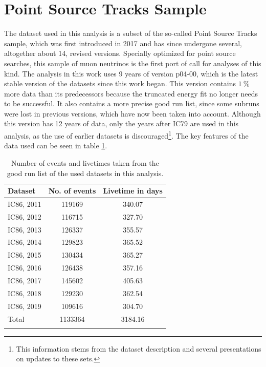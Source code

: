 \section{Point Source Tracks Sample} \label{sec:data}
%
%
%

The dataset used in this analysis is a subset of the so-called Point Source Tracks sample, which was first introduced in 2017 and has since undergone several, altogether about 14, revised versions.
Specially optimized for point source searches, this sample of muon neutrinos is the first port of call for analyses of this kind.
The analysis in this work uses 9 years of version p04-00, which is the latest stable version of the datasets since this work began.
This version contains $\SI{1}{\percent}$ more data than its predecessors because the truncated energy fit no longer needs to be successful.
It also contains a more precise good run list, since some subruns were lost in previous versions, which have now been taken into account.
Although this version has 12 years of data, only the years after IC79 are used in this analysis, as the use of earlier datasets is discouraged\footnote{This information stems from the dataset description and several presentations on updates to these sets.}.
The key features of the data used can be seen in table \ref{tab:data}.

\begin{table}
  \centering
  \caption{Number of events and livetimes taken from the good run list of the used datasets in this analysis.}
  \begin{tabular}{lcc}
    \toprule
    Dataset & No. of events & Livetime in days \\
    \toprule
    IC86, 2011 & 119169 & 340.07 \\
    IC86, 2012 & 116715 & 327.70 \\
    IC86, 2013 & 126337 & 355.57 \\
    IC86, 2014 & 129823 & 365.52 \\
    IC86, 2015 & 130434 & 365.27 \\
    IC86, 2016 & 126438 & 357.16 \\
    IC86, 2017 & 145602 & 405.63 \\
    IC86, 2018 & 129230 & 362.54 \\
    IC86, 2019 & 109616 & 304.70 \\
    \hline
    Total & 1133364 & 3184.16 \\
    \toprule
    \label{tab:data}
  \end{tabular}
\end{table}

